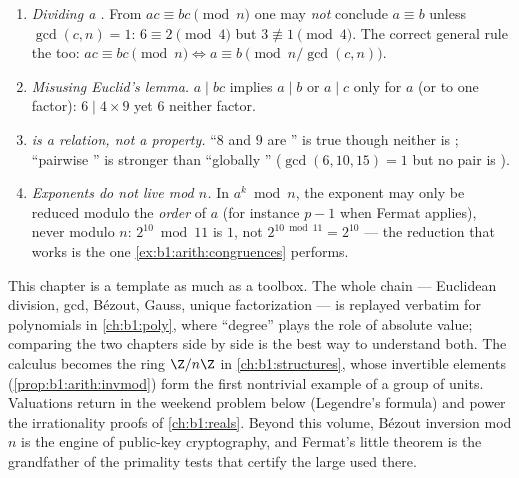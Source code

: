 \begin{remark}\label{rem:b1:arith:pitfalls}
\begin{enumerate}
  \item \emph{Dividing a .} From $ac \equiv bc \pmod n$
        one may \emph{not} conclude $a \equiv b$ unless $\gcd(c,
        n) = 1$: $6 \equiv 2 \pmod 4$ but $3 \not\equiv 1 \pmod
        4$. The correct general rule  the  too: $ac
        \equiv bc \pmod n \iff a \equiv b \pmod{n/\gcd(c,n)}$.
  \item \emph{Misusing Euclid's lemma.} $a \mid bc$ implies $a
        \mid b$ or $a \mid c$ only for $a$ \emph{} (or
         to one factor): $6 \mid 4 \times 9$ yet $6$
         neither factor.
  \item \emph{ is a relation, not a property.} ``$8$ and
        $9$ are '' is true though neither is ;
        ``pairwise '' is stronger than ``globally
        '' ($\gcd(6, 10, 15) = 1$ but no pair is
        ).
  \item \emph{Exponents do not live mod $n$.} In $a^k \bmod n$,
        the exponent may only be reduced modulo the \emph{order}
        of $a$ (for instance $p - 1$ when Fermat applies), never
        modulo $n$: $2^{10} \bmod 11$ is $1$, not $2^{10 \bmod
        11} = 2^{10}$ --- the reduction that works is the one
        \cref{ex:b1:arith:congruences} performs.
\end{enumerate}
\end{remark}

\begin{remark}\label{rem:b1:arith:whereused}
This chapter is a template as much as a toolbox. The whole chain
--- Euclidean division, gcd, Bézout, Gauss, unique factorization
--- is replayed verbatim for polynomials in \cref{ch:b1:poly},
where ``degree'' plays the role of absolute value; comparing the
two chapters side by side is the best way to understand both. The
 calculus becomes the ring $\Z/n\Z$ in
\cref{ch:b1:structures}, whose invertible elements
(\cref{prop:b1:arith:invmod}) form the first nontrivial example of
a group of units. Valuations return in the weekend problem below
(Legendre's formula) and power the irrationality proofs of
\cref{ch:b1:reals}. Beyond this volume, Bézout inversion mod $n$
is the engine of public-key cryptography, and Fermat's little
theorem is the grandfather of the primality tests that certify the
large  used there.
\end{remark}

